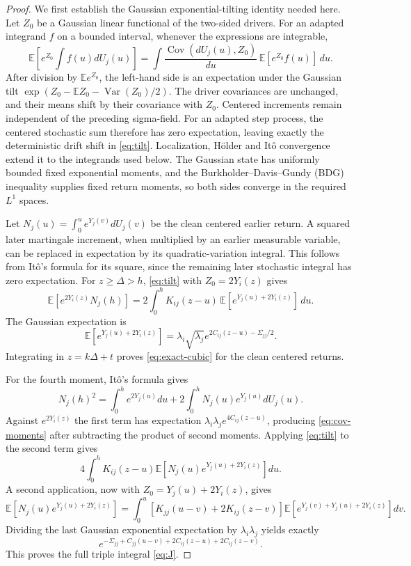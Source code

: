 \documentclass[11pt,a4paper]{amsart}
\theoremstyle{plain}
\theoremstyle{definition}
\theoremstyle{remark}
\DeclareMathOperator{\Var}{Var}
\DeclareMathOperator{\Cov}{Cov}
\newcommand{\EE}{\mathbb{E}}
\begin{document}
\begin{proof}
We first establish the Gaussian exponential-tilting identity needed here.
Let $Z_0$ be a Gaussian linear functional of the two-sided drivers. For an
adapted integrand $f$ on a bounded interval, whenever the expressions are
integrable,
\begin{equation}\label{eq:tilt}
 \EE\left[e^{Z_0}\int f(u)dU_j(u)\right]
 =\int\frac{\Cov(dU_j(u),Z_0)}{du}\,
                  \EE[e^{Z_0}f(u)]\,du.
\end{equation}
After division by $\EE e^{Z_0}$, the left-hand side is an expectation under
the Gaussian tilt $\exp(Z_0-\EE Z_0-\Var(Z_0)/2)$. The driver
covariances are unchanged, and their means shift by their covariance
with $Z_0$. Centered increments remain independent of the preceding
sigma-field. For an adapted step process, the centered stochastic sum
therefore has zero expectation, leaving exactly the deterministic drift
shift in \eqref{eq:tilt}. Localization, H\"older and It\^o convergence
extend it to the integrands used below. The Gaussian state has uniformly
bounded fixed exponential moments, and the Burkholder--Davis--Gundy
(BDG) inequality supplies fixed return moments, so both sides converge
in the required $L^1$ spaces.

Let $N_j(u)=\int_0^u e^{Y_j(v)}dU_j(v)$ be the clean centered earlier
return. A squared later martingale increment, when multiplied by an
earlier measurable variable, can be replaced in expectation by its
quadratic-variation integral. This follows from It\^o's formula for its
square, since the remaining later stochastic integral has zero expectation.
For $z\ge\Delta>h$, \eqref{eq:tilt} with $Z_0=2Y_i(z)$ gives
\[
 \EE[e^{2Y_i(z)}N_j(h)]
 =2\int_0^h K_{ij}(z-u)\,
                   \EE[e^{Y_j(u)+2Y_i(z)}]\,du.
\]
The Gaussian expectation is
\[
 \EE[e^{Y_j(u)+2Y_i(z)}]
 =\lambda_i\sqrt{\lambda_j}
                    e^{2C_{ij}(z-u)-\Sigma_{jj}/2}.
\]
Integrating in $z=k\Delta+t$ proves \eqref{eq:exact-cubic} for the clean
centered returns.

For the fourth moment, It\^o's formula gives
\[
 N_j(h)^2=\int_0^h e^{2Y_j(u)}du
             +2\int_0^h N_j(u)e^{Y_j(u)}dU_j(u).
\]
Against $e^{2Y_i(z)}$ the first term has expectation
$\lambda_i\lambda_j e^{4C_{ij}(z-u)}$, producing
\eqref{eq:cov-moments} after subtracting the product of second moments.
Applying \eqref{eq:tilt} to the second term gives
\[
 4\int_0^h K_{ij}(z-u)
                 \EE[N_j(u)e^{Y_j(u)+2Y_i(z)}]du.
\]
A second application, now with $Z_0=Y_j(u)+2Y_i(z)$, gives
\[
 \EE[N_j(u)e^{Y_j(u)+2Y_i(z)}]
 =\int_0^u [K_{jj}(u-v)+2K_{ij}(z-v)]
            \EE[e^{Y_j(v)+Y_j(u)+2Y_i(z)}]dv.
\]
Dividing the last Gaussian exponential expectation by
$\lambda_i\lambda_j$ yields exactly
\[
 e^{-\Sigma_{jj}+C_{jj}(u-v)+2C_{ij}(z-u)+2C_{ij}(z-v)}.
\]
This proves the full triple integral \eqref{eq:J}.


\end{proof}
\end{document}
